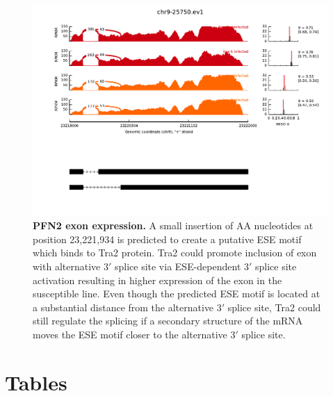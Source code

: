 \documentclass[10pt]{article}
\begin{document}
\begin{figure}[!ht]
    \begin{center}
        \includegraphics[width=6in]{pfn2_miso.pdf}
    \end{center}
    \caption{
        {\bf PFN2 exon expression.}
        A small insertion of AA nucleotides at position
        23,221,934 is predicted to create a putative ESE motif
        which binds to Tra2 protein.  Tra2 could promote
        inclusion of exon with alternative 3$\prime$ splice site
        via ESE-dependent 3$\prime$ splice site activation
        resulting in higher expression of the exon in the
        susceptible line.  Even though the predicted ESE motif is
        located at a substantial distance from the alternative
        3$\prime$ splice site, Tra2 could still regulate the
    splicing if a secondary structure of the mRNA moves the ESE
motif closer to the alternative 3$\prime$ splice site.  }
    \label{pfn2}
\end{figure}

\section*{Tables}
\end{document}

